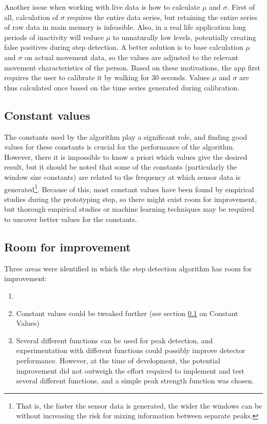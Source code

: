 Another issue when working with live data is how to calculate $\mu$ and $\sigma$. First of all, calculation of $\sigma$ requires the entire data series, but retaining the entire series of raw data in main memory is infeasible. Also, in a real life application long periods of inactivity will reduce $\mu$ to unnaturally low levels, potentially creating false positives during step detection. A better solution is to base calculation $\mu$ and $\sigma$ on actual movement data, so the values are adjusted to the relevant movement characteristics of the person. Based on these motivations, the app first requires the user to calibrate it by walking for 30 seconds. Values $\mu$ and $\sigma$ are thus calculated once based on the time series generated during calibration. 

\subsection{Constant values}
\label{constant_values}
The constants used by the algorithm play a significant role, and finding good values for these constants is crucial for the performance of the algorithm. However, there it is impossible to know a priori which values give the desired result, but it should be noted that some of the constants (particularly the window size constants) are related to the frequency at which sensor data is generated\footnote{That is, the faster the sensor data is generated, the wider the windows can be without increasing the risk for mixing information between separate peaks.}. Because of this, most constant values have been found by empirical studies during the prototyping step, so there might exist room for improvement, but thorough empirical studies or machine learning techniques may be required to uncover better values for the constants.

\subsection{Room for improvement}
Three areas were identified in which the step detection algorithm has room for improvement:
\begin{enumerate}
\item 
\item Constant values could be tweaked further (see section \ref{constant_values} on Constant Values)
\item Several different functions can be used for peak detection, and experimentation with different functions could possibly improve detector performance. However, at the time of development, the potential improvement did not outweigh the effort required to implement and test several different functions, and a simple peak strength function was chosen. 
\end{enumerate}